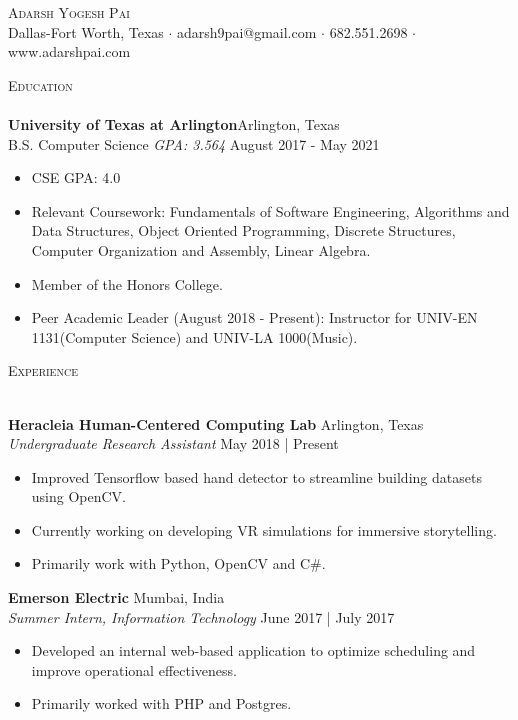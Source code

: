 \documentclass[a4paper]{article}
\newcommand{\lineunder} {
    \vspace*{-8pt} \\
    \hspace*{-18pt} \hrulefill \\
}
\newcommand{\header} [1] {
    {\hspace*{-18pt}\vspace*{6pt} \textsc{#1}}
    \vspace*{-6pt} \lineunder
}
\begin{document}
\vspace*{-40pt}

    


\vspace*{-10pt}
\begin{center}
	{\Huge \scshape {Adarsh Yogesh Pai}}\\
	Dallas-Fort Worth, Texas $\cdot$ adarsh9pai@gmail.com $\cdot$ 682.551.2698 $\cdot$ www.adarshpai.com\\
\end{center}

\header{Education}
\textbf{University of Texas at Arlington}\hfill Arlington, Texas\\
B.S. Computer Science \textit{GPA: 3.564} \hfill August 2017 - May 2021\\

\begin{itemize} \itemsep 1pt
	\item CSE GPA: 4.0
	\item Relevant Coursework: Fundamentals of Software Engineering, Algorithms and Data Structures, Object Oriented Programming, Discrete Structures, Computer Organization and Assembly, Linear Algebra.
	\item Member of the Honors College.
         \item Peer Academic Leader (August 2018 - Present): Instructor for UNIV-EN 1131(Computer Science) and UNIV-LA 1000(Music).


\end{itemize}
\vspace{2mm}
\header{Experience}
\vspace{1mm}

\textbf{Heracleia Human-Centered Computing Lab} \hfill Arlington, Texas\\
\textit{Undergraduate Research Assistant} \hfill May 2018 | Present\\
\vspace{-1mm}
\begin{itemize} \itemsep 1pt
	\item Improved Tensorflow based hand detector to streamline building datasets using OpenCV.
	\item Currently working on developing VR simulations for immersive storytelling.
	\item Primarily work with Python, OpenCV and C\#.
\end{itemize}

\textbf{Emerson Electric} \hfill Mumbai, India\\
\textit{Summer Intern, Information Technology} \hfill June 2017 | July 2017\\
\vspace{-1mm}
\begin{itemize} \itemsep 1pt
	\item Developed an internal web-based application to optimize scheduling and improve operational effectiveness.
	\item Primarily worked with PHP and Postgres.
\end{itemize}
\end{document}
